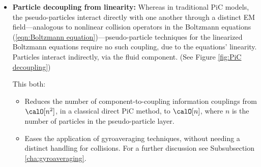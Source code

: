     \begin{itemize}
        \item  {\bf Particle decoupling from linearity:} Whereas in traditional PiC models, the pseudo-particles interact directly with one another through a distinct EM field---analogous to nonlinear collision operators in the Boltzmann equations (\ref{eqn:Boltzmann equation})---pseudo-particle techniques for the linearized Boltzmann equations require no such coupling, due to the equations' linearity. Particles interact indirectly, via the fluid component. (See Figure \ref{fig:PiC decoupling})

        This both:
        \begin{itemize}
            \item  Reduces the number of component-to-coupling information couplings from $\calO[n^{2}]$, in a classical direct PiC method, to $\calO[n]$, where $n$ is the number of particles in the pseudo-particle layer.
            \item  Eases the application of gyroaveraging techniques, without needing a distinct handling for collisions. For a further discussion see Subsubsection \ref{cha:gyroaveraging}.
        \end{itemize}
        
        \begin{figure}[!ht]
            \centering
            \begin{subfigure}{0.5\textwidth}
                \centering
\end{subfigure}
\end{figure}
\end{itemize}
